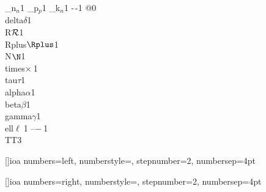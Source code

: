 {        {_n}{{$_n$}}1
        {_p}{{$_p$}}1
        {_k}{{$_n$}}1
        {-}{{$\ms{-}$}}1
        {@}{{}}0
        {\\delta}{{$\delta$}}1
        {\\R}{{${\cal R}$}}1
        {\\Rplus}{{$\Rplus$}}1
        {\\N}{{$\N$}}1
        {\\times}{{$\times\ $}}1
        {\\tau}{{$\tau$}}1
        {\\alpha}{{$\alpha$}}1
        {\\beta}{{$\beta$}}1
        {\\gamma}{{$\gamma$}}1
        {\\ell}{{$\ell\ $}}1
        {--}{{$-\ $}}1
        {\\TT}{{\hspace{1.5em}}}3
      }

[]{ioa}
{
  numbers=left,
  numberstyle=\tiny,
  stepnumber=2,
  numbersep=4pt
}

[]{ioa}
{
  numbers=right,
  numberstyle=\tiny,
  stepnumber=2,
  numbersep=4pt
}

